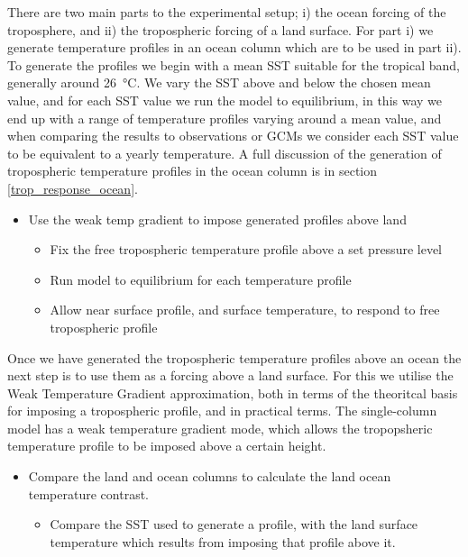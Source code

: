 There are two main parts to the experimental setup; i) the ocean forcing of the 
troposphere, and ii) the tropospheric forcing of a land surface. For part i) we	 
generate temperature profiles in an ocean column which are to be used in part 
ii). To generate the profiles we begin with a mean SST suitable for the tropical 
band, generally around \SI{26}{\degreeCelsius}. We vary the SST above and below 
the chosen mean value, and for each SST value we run the model to equilibrium, 
in this way we end up with a range of temperature profiles varying around a mean 
value, and when comparing the results to observations or GCMs we consider each 
SST value to be equivalent to a yearly temperature. A full discussion of the 
generation of tropospheric temperature profiles in the ocean column is in 
section \ref{trop_response_ocean}.

\begin{itemize}
		\item Use the weak temp gradient to impose generated profiles above land
		\begin{itemize}
			\item Fix the free tropospheric temperature profile above a set 
			pressure level
		\item Run model to equilibrium for each temperature profile
		\item Allow near surface profile, and surface temperature, to 
			respond to free tropospheric profile
		\end{itemize}
\end{itemize}

Once we have generated the tropospheric temperature profiles above an ocean the 
next step is to use them as a forcing above a land surface. For this we utilise 
the Weak Temperature Gradient approximation, both in terms of the theoritcal 
basis for imposing a tropospheric profile, and in practical terms. The 
single-column model has a weak temperature gradient mode, which allows the 
tropopsheric temperature profile to be imposed above a certain height.


\begin{itemize}
	\item Compare the land and ocean columns to calculate the land ocean 
		temperature contrast.
		\begin{itemize}
			\item Compare the SST used to generate a profile, with the land 
				surface temperature which results from imposing that profile 
				above it.
		\end{itemize}
\end{itemize}


